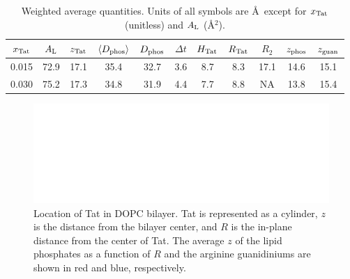 \begin{table}[htbp]
  \centering
  \begin{tabular}{ccccccccccc}
    \hline
    \rule{0pt}{14pt} %
    $x_\textrm{Tat}$ & $A_\textrm{L}$ & $z_\textrm{Tat}$ & $\langle D_\text{phos}\rangle$ & $D_\text{phos}$ & $\Delta t$ & $H_\textrm{Tat}$ & $R_\textrm{Tat}$ & $R_2$ & $z_\textrm{phos}$ & $z_\textrm{guan}$ \\
    \hline    
    0.015 & 72.9 & 17.1 & 35.4 & 32.7 & 3.6 & 8.7 & 8.3 & 17.1 & 14.6 & 15.1 \\  
    0.030 & 75.2 & 17.3 & 34.8 & 31.9 & 4.4 & 7.7 & 8.8 & NA & 13.8 & 15.4 \\
    \hline
  \end{tabular}
  \caption[Weighted average quantities]
  {Weighted average quantities.
  Units of all symbols are \AA\ except for $x_\textrm{Tat}$ (unitless)
  and $A_\textrm{L}$ (\AA$^2$).}
  \label{tab:MD_summary}
\end{table}

\begin{figure}[htbp]
  \centering
  \includegraphics[width=1\textwidth]{figures/Tat/figure9}
  \caption[Location of Tat in DOPC bilayer]
  {Location of Tat in DOPC bilayer. Tat is represented as a cylinder, $z$ is the distance
  from the bilayer center, and $R$ is the in-plane distance from the center of Tat. The average $z$ of
  the lipid phosphates as a function of $R$ and the arginine guanidiniums are shown in red and blue,
  respectively.}
  \label{fig:figure9}
\end{figure}


